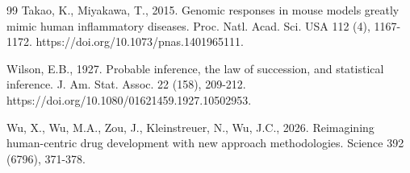 \documentclass[review,12pt,authoryear]{elsarticle}
\begin{document}
\begin{thebibliography}{99}
Takao, K., Miyakawa, T., 2015. Genomic responses in mouse models greatly mimic
human inflammatory diseases. Proc. Natl. Acad. Sci. USA 112 (4), 1167-1172.
https://doi.org/10.1073/pnas.1401965111.

Wilson, E.B., 1927. Probable inference, the law of succession, and statistical
inference. J. Am. Stat. Assoc. 22 (158), 209-212.
https://doi.org/10.1080/01621459.1927.10502953.

Wu, X., Wu, M.A., Zou, J., Kleinstreuer, N., Wu, J.C., 2026. Reimagining
human-centric drug development with new approach methodologies. Science 392
(6796), 371-378.

\end{thebibliography}
\end{document}
